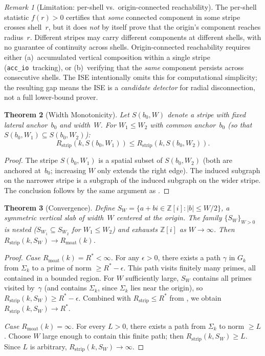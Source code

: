 \documentclass[11pt,a4paper]{article}
\newtheorem{theorem}{Theorem}[section]
\theoremstyle{definition}
\theoremstyle{remark}
\newtheorem{remark}[theorem]{Remark}
\newcommand{\Zi}{\mathbb{Z}[i]}
\begin{document}
\begin{remark}[Limitation: per-shell vs.\ origin-connected reachability]
\label{rem:perShell}
The per-shell statistic $f(r) > 0$ certifies that \emph{some}
connected component in some stripe crosses shell~$r$, but it does
\emph{not} by itself prove that the origin's component reaches
radius~$r$.  Different stripes may carry different components at
different shells, with no guarantee of continuity across shells.
Origin-connected reachability requires either (a)~accumulated
vertical composition within a single stripe
(\texttt{acc\_io}~tracking), or (b)~verifying that the \emph{same}
component persists across consecutive shells.  The ISE intentionally
omits this for computational simplicity; the resulting gap means the
ISE is a \emph{candidate detector} for radial disconnection, not a
full lower-bound prover.
\end{remark}

\begin{theorem}[Width Monotonicity]\label{thm:width}
Let $S(b_0, W)$ denote a stripe with fixed lateral anchor~$b_0$ and
width~$W$.  For $W_1 \le W_2$ with common anchor~$b_0$ (so that
$S(b_0, W_1) \subseteq S(b_0, W_2)$):
\[
  R_{\mathrm{strip}}(k, S(b_0, W_1)) \le R_{\mathrm{strip}}(k, S(b_0, W_2)).
\]
\end{theorem}

\begin{proof}
The stripe $S(b_0, W_1)$ is a spatial subset of $S(b_0, W_2)$
(both are anchored at~$b_0$; increasing $W$ only extends the right
edge).  The induced subgraph on the narrower stripe is a subgraph of
the induced subgraph on the wider stripe.  The conclusion follows by
the same argument as .
\end{proof}

\begin{theorem}[Convergence]\label{thm:conv}
Define $S_W = \{a + bi \in \Zi : |b| \le W/2\}$, a symmetric vertical
slab of width~$W$ centered at the origin.  The family $\{S_W\}_{W>0}$
is nested ($S_{W_1} \subseteq S_{W_2}$ for $W_1 \le W_2$) and exhausts
$\Zi$ as $W \to \infty$.  Then
$R_{\mathrm{strip}}(k, S_W) \to R_{\mathrm{moat}}(k)$.
\end{theorem}

\begin{proof}
\emph{Case $R_{\mathrm{moat}}(k) = R^* < \infty$.}\enspace
For any $\epsilon > 0$, there exists a path $\gamma$ in $G_k$ from
$\Sigma_k$ to a prime of norm $\ge R^* - \epsilon$.
This path visits finitely many primes, all contained in a bounded
region.  For $W$ sufficiently large, $S_W$ contains all primes
visited by~$\gamma$ (and contains $\Sigma_k$, since $\Sigma_k$ lies
near the origin), so
$R_{\mathrm{strip}}(k, S_W) \ge R^* - \epsilon$.  Combined with
$R_{\mathrm{strip}} \le R^*$ from , we obtain
$R_{\mathrm{strip}}(k, S_W) \to R^*$.

\emph{Case $R_{\mathrm{moat}}(k) = \infty$.}\enspace
For every $L > 0$, there exists a path from $\Sigma_k$ to norm
$\ge L$.  Choose $W$ large enough to contain this finite path;
then $R_{\mathrm{strip}}(k, S_W) \ge L$.  Since $L$ is arbitrary,
$R_{\mathrm{strip}}(k, S_W) \to \infty$.
\end{proof}
\end{document}
